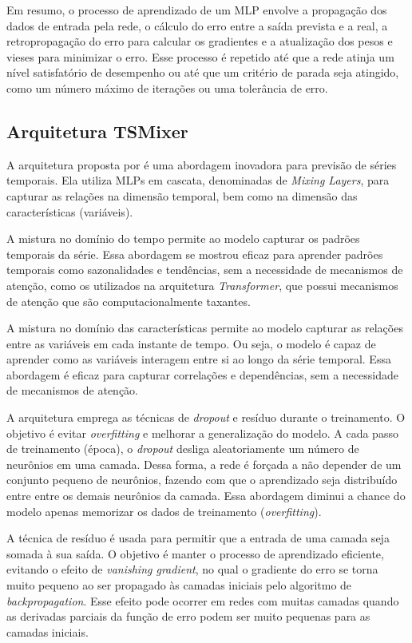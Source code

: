 Em resumo, o processo de aprendizado de um MLP envolve a propagação dos dados de entrada pela rede, o cálculo do erro entre 
a saída prevista e a real, a retropropagação do erro para calcular os gradientes e a atualização dos pesos e vieses para 
minimizar o erro. Esse processo é repetido até que a rede atinja um nível satisfatório de desempenho ou até que um critério
de parada seja atingido, como um número máximo de iterações ou uma tolerância de erro.	


\subsection{Arquitetura TSMixer}
A arquitetura proposta por  é uma abordagem inovadora para previsão de séries temporais. Ela utiliza
MLPs em cascata, denominadas de \textit{Mixing Layers}, para capturar as relações na dimensão temporal, bem como na dimensão das 
características (variáveis).

A mistura no domínio do tempo permite ao modelo capturar os padrões temporais da série. Essa abordagem se mostrou 
eficaz para aprender padrões temporais como sazonalidades e tendências, sem a necessidade de mecanismos de atenção, 
como os utilizados na arquitetura \textit{Transformer}, que possui mecanismos de atenção que são computacionalmente taxantes.

A mistura no domínio das características permite ao modelo capturar as relações entre as variáveis em cada instante de tempo.
Ou seja, o modelo é capaz de aprender como as variáveis interagem entre si ao longo da série temporal. Essa abordagem é 
eficaz para capturar correlações e dependências, sem a necessidade de mecanismos de atenção.

A arquitetura emprega as técnicas de \textit{dropout} e resíduo durante o treinamento. O objetivo é evitar \textit{overfitting}
e melhorar a generalização do modelo. A cada passo de treinamento (época), o \textit{dropout} desliga aleatoriamente um
número de neurônios em uma camada. Dessa forma, a rede é forçada a não depender de um conjunto pequeno de neurônios,
fazendo com que o aprendizado seja distribuído entre entre os demais neurônios da camada. Essa abordagem diminui a chance
do modelo apenas memorizar os dados de treinamento (\textit{overfitting}).

A técnica de resíduo é usada para permitir que a entrada de uma camada seja somada à sua saída. O objetivo é manter o
processo de aprendizado eficiente, evitando o efeito de \textit{vanishing gradient}, no qual o gradiente do erro se torna
muito pequeno ao ser propagado às camadas iniciais pelo algoritmo de \textit{backpropagation}. Esse efeito pode ocorrer 
em redes com muitas camadas quando as derivadas parciais da função de erro podem ser muito pequenas para as camadas iniciais.

